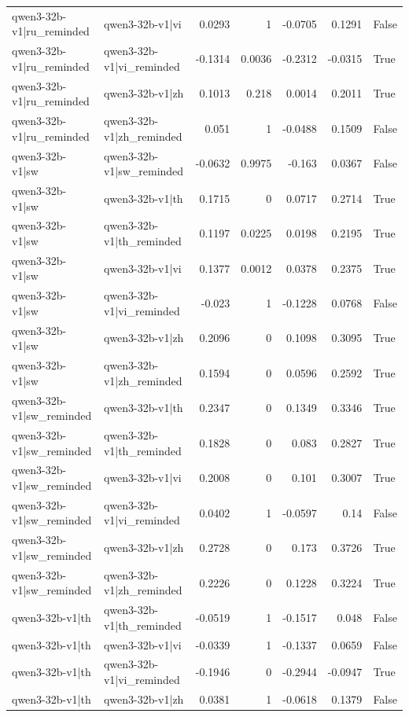 \begin{table}
\begin{tabular}{l l r r r r l}
qwen3-32b-v1|ru_reminded & qwen3-32b-v1|vi & 0.0293 & 1 & -0.0705 & 0.1291 & False \\
qwen3-32b-v1|ru_reminded & qwen3-32b-v1|vi_reminded & -0.1314 & 0.0036 & -0.2312 & -0.0315 & True \\
qwen3-32b-v1|ru_reminded & qwen3-32b-v1|zh & 0.1013 & 0.218 & 0.0014 & 0.2011 & True \\
qwen3-32b-v1|ru_reminded & qwen3-32b-v1|zh_reminded & 0.051 & 1 & -0.0488 & 0.1509 & False \\
qwen3-32b-v1|sw & qwen3-32b-v1|sw_reminded & -0.0632 & 0.9975 & -0.163 & 0.0367 & False \\
qwen3-32b-v1|sw & qwen3-32b-v1|th & 0.1715 & 0 & 0.0717 & 0.2714 & True \\
qwen3-32b-v1|sw & qwen3-32b-v1|th_reminded & 0.1197 & 0.0225 & 0.0198 & 0.2195 & True \\
qwen3-32b-v1|sw & qwen3-32b-v1|vi & 0.1377 & 0.0012 & 0.0378 & 0.2375 & True \\
qwen3-32b-v1|sw & qwen3-32b-v1|vi_reminded & -0.023 & 1 & -0.1228 & 0.0768 & False \\
qwen3-32b-v1|sw & qwen3-32b-v1|zh & 0.2096 & 0 & 0.1098 & 0.3095 & True \\
qwen3-32b-v1|sw & qwen3-32b-v1|zh_reminded & 0.1594 & 0 & 0.0596 & 0.2592 & True \\
qwen3-32b-v1|sw_reminded & qwen3-32b-v1|th & 0.2347 & 0 & 0.1349 & 0.3346 & True \\
qwen3-32b-v1|sw_reminded & qwen3-32b-v1|th_reminded & 0.1828 & 0 & 0.083 & 0.2827 & True \\
qwen3-32b-v1|sw_reminded & qwen3-32b-v1|vi & 0.2008 & 0 & 0.101 & 0.3007 & True \\
qwen3-32b-v1|sw_reminded & qwen3-32b-v1|vi_reminded & 0.0402 & 1 & -0.0597 & 0.14 & False \\
qwen3-32b-v1|sw_reminded & qwen3-32b-v1|zh & 0.2728 & 0 & 0.173 & 0.3726 & True \\
qwen3-32b-v1|sw_reminded & qwen3-32b-v1|zh_reminded & 0.2226 & 0 & 0.1228 & 0.3224 & True \\
qwen3-32b-v1|th & qwen3-32b-v1|th_reminded & -0.0519 & 1 & -0.1517 & 0.048 & False \\
qwen3-32b-v1|th & qwen3-32b-v1|vi & -0.0339 & 1 & -0.1337 & 0.0659 & False \\
qwen3-32b-v1|th & qwen3-32b-v1|vi_reminded & -0.1946 & 0 & -0.2944 & -0.0947 & True \\
qwen3-32b-v1|th & qwen3-32b-v1|zh & 0.0381 & 1 & -0.0618 & 0.1379 & False \\

\end{tabular}
\end{table}
